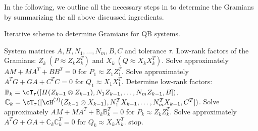 In the following, we  outline all the necessary steps in  to determine the Gramians by summarizing the all above discussed ingredients.
\begin{algorithm}[tb!]
 \caption{Iterative scheme to determine Gramians for QB systems.}
 \begin{algorithmic}[1]
     System matrices $ A, H,N_1,\ldots,N_m, B,C$ and tolerance $\tau$.
 Low-rank factors of the Gramians: $Z_k~ (P \approx Z_kZ_k^T)$ and $ X_k~ (Q \approx X_kX_k^T)$.
    \State Solve approximately $AM + MA^T + BB^T = 0$ for $P_1 \approx Z_1Z_1^T$.
    \State Solve approximately $A^TG + GA + C^TC = 0$ for $Q_1 \approx X_1X_1^T$.
        \State Determine low-rank factors:
        \Statex \label{step} \qquad\qquad $\mathbb B_k = \cT_{\tau} ([H(Z_{k-1} \otimes Z_{k-1}),  N_1Z_{k-1},\ldots,N_mZ_{k-1}  ,B ])$,%
        \Statex \qquad\qquad $\mathbb C_k = \cT_{\tau} ([\cH^{(2)}(Z_{k-1} \otimes X_{k-1}),  N_1^T X_{k-1},\ldots,N_m^T X_{k-1},C^T ]) $.
        \State Solve approximately $AM + M A^T + \mathbb B_k\mathbb B_k^T = 0$ for $P_k\approx Z_k Z_k^T $.
        \State Solve approximately $A^TG + G A + \mathbb C_k \mathbb C_k^T = 0$ for $Q_k\approx X_kX_k^T $.
	 stop. \EndIf
    \EndFor
\end{algorithmic}\label{algo:solv_gram}
\end{algorithm}

